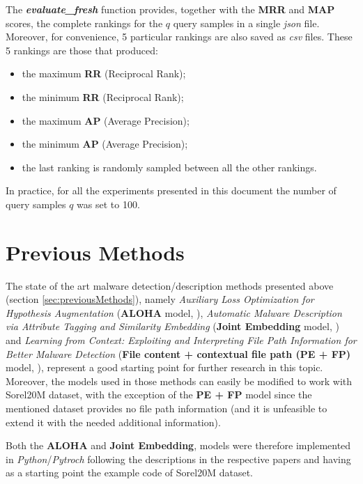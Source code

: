 \documentclass[pdfa%
,cucitura%
]{toptesi}
\begin{document}
The \textit{\textbf{evaluate\_fresh}} function provides, together with the \textbf{MRR} and \textbf{MAP} scores, the complete rankings for the $q$ query samples in a single \textit{json} file. Moreover, for convenience, 5 particular rankings are also saved as \textit{csv} files. These 5 rankings are those that produced:
\begin{itemize}
	\item the maximum \textbf{RR} (Reciprocal Rank);
	
	\item the minimum \textbf{RR} (Reciprocal Rank);
	
	\item the maximum \textbf{AP} (Average Precision);
	
	\item the minimum \textbf{AP} (Average Precision);
	
	\item the last ranking is randomly sampled between all the other rankings.
\end{itemize}

In practice, for all the experiments presented in this document the number of query samples $q$ was set to 100.

\chapter{Previous Methods}
The state of the art malware detection/description methods presented above (section \ref{sec:previousMethods}), namely \textit{Auxiliary Loss Optimization for Hypothesis Augmentation} (\textbf{ALOHA} model, \cite{ruddALOHA}), \textit{Automatic Malware Description via Attribute Tagging and Similarity Embedding} (\textbf{Joint Embedding} model, \cite{DucauAMDATSE}) and \textit{Learning from Context: Exploiting and Interpreting File Path Information for Better Malware Detection} (\textbf{File content + contextual file path (PE + FP)} model, \cite{KyadigeLFCEIFPIBMD}), represent a good starting point for further research in this topic. Moreover, the models used in those methods can easily be modified to work with Sorel20M dataset, with the exception of the \textbf{PE + FP} model \cite{KyadigeLFCEIFPIBMD} since the mentioned dataset provides no file path information (and it is unfeasible to extend it with the needed additional information).

Both the \textbf{ALOHA} \cite{ruddALOHA} and \textbf{Joint Embedding}, \cite{DucauAMDATSE} models were therefore implemented in \textit{Python}/\textit{Pytroch} following the descriptions in the respective papers and having as a starting point the example code of Sorel20M dataset.
\end{document}
